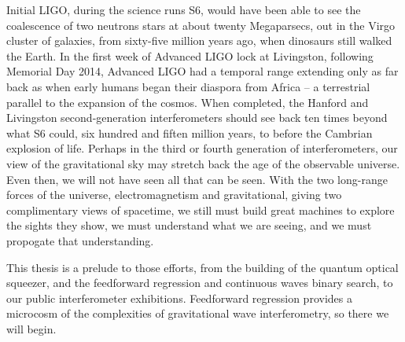 Initial LIGO, during the science runs S6, would have been able to see the coalescence of two neutrons stars at about twenty Megaparsecs, out in the Virgo cluster of galaxies, from sixty-five million years ago, when dinosaurs still walked the Earth. 
In the first week of Advanced LIGO lock at Livingston, following Memorial Day 2014, Advanced LIGO had a temporal range extending only as far back as when early humans began their diaspora from Africa -- a terrestrial parallel to the expansion of the cosmos.
When completed, the Hanford and Livingston second-generation interferometers should see back ten times beyond what S6 could, six hundred and fiften million years, to before the Cambrian explosion of life.
Perhaps in the third or fourth generation of interferometers, our view of the gravitational sky may stretch back the age of the observable universe.
Even then, we will not have seen all that can be seen.
With the two long-range forces of the universe, electromagnetism and gravitational, giving two complimentary views of spacetime, we still must build great machines to explore the sights they show, we must understand what we are seeing, and we must propogate that understanding. 

This thesis is a prelude to those efforts, from the building of the quantum optical squeezer, and the feedforward regression and continuous waves binary search, to our public interferometer exhibitions.   
Feedforward regression provides a microcosm of the complexities of gravitational wave interferometry, so there we will begin.


            
%

%
%
%
  

